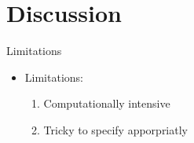 \documentclass{beamer}
\begin{document}
\section{Discussion}
\begin{frame}{Limitations}
\begin{itemize}
\item Limitations:
  \begin{enumerate}[1)]
  \item Computationally intensive
  \item Tricky to specify apporpriatly
  \end{enumerate}
\end{itemize}
\end{frame}
   
\end{document}
